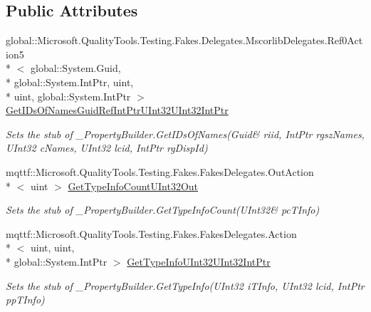 \subsection*{Public Attributes}
\begin{DoxyCompactItemize}
\item 
global\-::\-Microsoft.\-Quality\-Tools.\-Testing.\-Fakes.\-Delegates.\-Mscorlib\-Delegates.\-Ref0\-Action5\\*
$<$ global\-::\-System.\-Guid, \\*
global\-::\-System.\-Int\-Ptr, uint, \\*
uint, global\-::\-System.\-Int\-Ptr $>$ \hyperlink{class_system_1_1_runtime_1_1_interop_services_1_1_fakes_1_1_stub___property_builder_ac66a5d5f4341f09b63a1f74d9d010b9b}{Get\-I\-Ds\-Of\-Names\-Guid\-Ref\-Int\-Ptr\-U\-Int32\-U\-Int32\-Int\-Ptr}
\begin{DoxyCompactList}\small\item\em Sets the stub of \-\_\-\-Property\-Builder.\-Get\-I\-Ds\-Of\-Names(Guid\& riid, Int\-Ptr rgsz\-Names, U\-Int32 c\-Names, U\-Int32 lcid, Int\-Ptr rg\-Disp\-Id)\end{DoxyCompactList}\item 
mqttf\-::\-Microsoft.\-Quality\-Tools.\-Testing.\-Fakes.\-Fakes\-Delegates.\-Out\-Action\\*
$<$ uint $>$ \hyperlink{class_system_1_1_runtime_1_1_interop_services_1_1_fakes_1_1_stub___property_builder_acee2a90469fef63f0923f4ed5898533a}{Get\-Type\-Info\-Count\-U\-Int32\-Out}
\begin{DoxyCompactList}\small\item\em Sets the stub of \-\_\-\-Property\-Builder.\-Get\-Type\-Info\-Count(U\-Int32\& pc\-T\-Info)\end{DoxyCompactList}\item 
mqttf\-::\-Microsoft.\-Quality\-Tools.\-Testing.\-Fakes.\-Fakes\-Delegates.\-Action\\*
$<$ uint, uint, \\*
global\-::\-System.\-Int\-Ptr $>$ \hyperlink{class_system_1_1_runtime_1_1_interop_services_1_1_fakes_1_1_stub___property_builder_a653ced2b6b657952a10482a61b66e834}{Get\-Type\-Info\-U\-Int32\-U\-Int32\-Int\-Ptr}
\begin{DoxyCompactList}\small\item\em Sets the stub of \-\_\-\-Property\-Builder.\-Get\-Type\-Info(\-U\-Int32 i\-T\-Info, U\-Int32 lcid, Int\-Ptr pp\-T\-Info)\end{DoxyCompactList}\item 

\end{DoxyCompactItemize}

